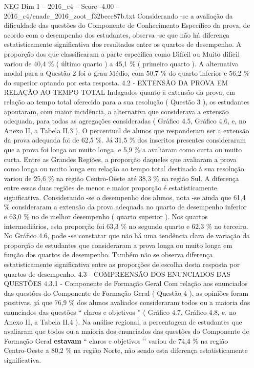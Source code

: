 \begin{textsample}{NEG Dim 1 – 2016\_c4 – Score -4.00 – 2016\_c4/enade\_2016\_zoot\_f32beec87b.txt}
Considerando -se a avaliação da dificuldade das questões do Componente de Conhecimento Específico da prova, de acordo com o desempenho dos estudantes, observa -se que não há diferença estatisticamente significativa dos resultados entre os quartos de desempenho.
A proporção dos que classificaram a parte específica como Difícil ou Muito difícil variou de 40,4 \% ( último quarto ) a 45,1 \% ( primeiro quarto ).
A alternativa modal para a Questão 2 foi o grau Médio, com 50,7 \% do quarto inferior e 56,2 \% do superior optando por esta resposta. 4.2 - EXTENSÃO DA PROVA EM RELAÇÃO AO TEMPO TOTAL Indagados quanto à extensão da prova, em relação ao tempo total oferecido para a sua resolução ( Questão 3 ), os estudantes apontaram, com maior incidência, a alternativa que considerava a extensão adequada, para todas as agregações consideradas ( Gráfico 4.5, Gráfico 4.6, e, no Anexo II, a Tabela II.3 ).
O percentual de alunos que responderam ser a extensão da prova adequada foi de 62,5 \%.
Já 31,5 \% dos inscritos presentes consideraram que a prova foi longa ou muito longa, e 5,9 \% a avaliaram como curta ou muito curta.
Entre as Grandes Regiões, a proporção daqueles que avaliaram a prova como longa ou muito longa em relação ao tempo total destinado à sua resolução variou de 25,6 \% na região Centro-Oeste até 38,3 \% na região Sul.
A diferença entre essas duas regiões de menor e maior proporção é estatisticamente significativa.
Considerando -se o desempenho dos alunos, nota -se ainda que 61,4 \% consideraram a extensão da prova adequada no quarto de desempenho inferior e 63,0 \% no de melhor desempenho ( quarto superior ).
Nos quartos intermediários, esta proporção foi 63,3 \% no segundo quarto e 62,3 \% no terceiro.
No Gráfico 4.6, pode -se constatar que não há uma tendência clara de variação da proporção de estudantes que consideraram a prova longa ou muito longa em função dos quartos de desempenho.
Também não se observa diferença estatisticamente significativa entre as proporções de escolha desta resposta por quartos de desempenho. 4.3 - COMPREENSÃO DOS ENUNCIADOS DAS QUESTÕES 4.3.1 - Componente de Formação Geral Com relação aos enunciados das questões do Componente de Formação Geral ( Questão 4 ), as opiniões foram positivas, já que 76,9 \% dos alunos avaliados consideraram todos ou a maioria dos enunciados das questões “ claros e objetivos ” ( Gráfico 4.7, Gráfico 4.8, e, no Anexo II, a Tabela II.4 ).
Na análise regional, a percentagem de estudantes que avaliaram que todos ou a maioria dos enunciados das questões do Componente de Formação Geral \textbf{estavam} “ claros e objetivos ” variou de 74,4 \% na região Centro-Oeste a 80,2 \% na região Norte, não sendo esta diferença estatisticamente significativa.

\end{textsample}
